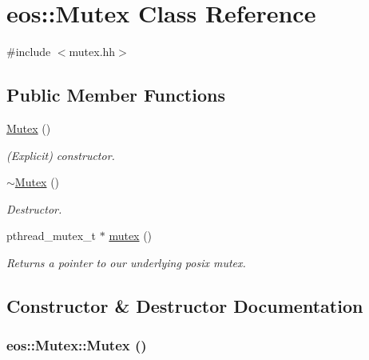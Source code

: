 \hypertarget{classeos_1_1Mutex}{
\section{eos::Mutex Class Reference}
\label{classeos_1_1Mutex}
}


{\ttfamily \#include $<$mutex.hh$>$}\subsection*{Public Member Functions}
\begin{DoxyCompactItemize}
\item 
\hyperlink{classeos_1_1Mutex_a3d07ba9ee73a295bc98250bd33825375}{Mutex} ()
\begin{DoxyCompactList}\small\item\em (Explicit) constructor. \item\end{DoxyCompactList}\item 
\hyperlink{classeos_1_1Mutex_ab721ec095c12b464fd178bb2fc80496a}{$\sim$Mutex} ()
\begin{DoxyCompactList}\small\item\em Destructor. \item\end{DoxyCompactList}\item 
pthread\_\-mutex\_\-t $\ast$ \hyperlink{classeos_1_1Mutex_a7f5648012d5eb8577a0e4c1b62a0ea38}{mutex} ()
\begin{DoxyCompactList}\small\item\em Returns a pointer to our underlying posix mutex. \item\end{DoxyCompactList}\end{DoxyCompactItemize}


\subsection{Constructor \& Destructor Documentation}
\hypertarget{classeos_1_1Mutex_a3d07ba9ee73a295bc98250bd33825375}{
\subsubsection[{Mutex}]{\setlength{\rightskip}{0pt plus 5cm}eos::Mutex::Mutex ()}}
\label{classeos_1_1Mutex_a3d07ba9ee73a295bc98250bd33825375}


